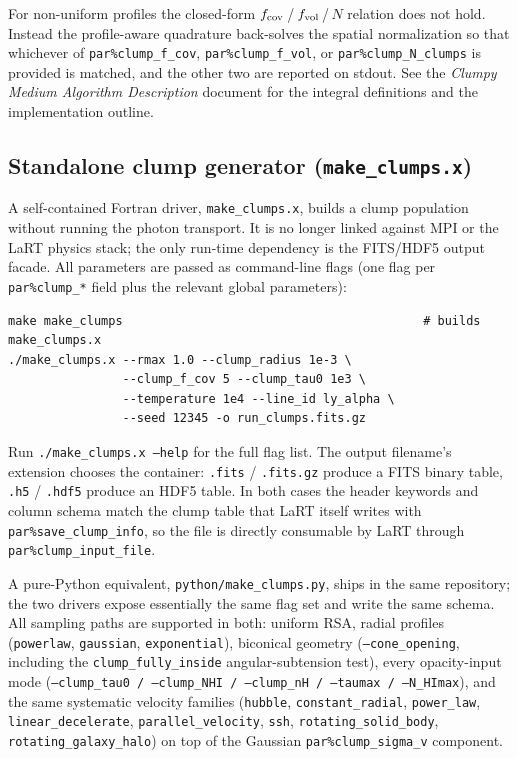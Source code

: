 \documentclass[english,a4paper]{my_memo}
\newcommand{\parm}[1]{\texttt{par\%#1}}
\begin{document}
\begin{sloppypar}
For non-uniform profiles the closed-form
$f_{\rm cov}$\,/\,$f_{\rm vol}$\,/\,$N$ relation does not hold.  Instead
the profile-aware quadrature back-solves the spatial normalization so
that whichever of \parm{clump\_f\_cov}, \parm{clump\_f\_vol}, or
\parm{clump\_N\_clumps} is provided is matched, and the other two are
reported on stdout.  See the \emph{Clumpy Medium Algorithm Description}
document for the integral definitions and the implementation outline.
\end{sloppypar}

\subsection{Standalone clump generator (\texttt{make\_clumps.x})}
\label{sec:make_clumps}

A self-contained Fortran driver, \texttt{make\_clumps.x}, builds a
clump population without running the photon transport.  It is no longer
linked against MPI or the LaRT physics stack; the only run-time
dependency is the FITS/HDF5 output facade.  All parameters are passed
as command-line flags (one flag per \texttt{par\%clump\_*} field plus
the relevant global parameters):

\begin{lstlisting}
make make_clumps                                          # builds make_clumps.x
./make_clumps.x --rmax 1.0 --clump_radius 1e-3 \
                --clump_f_cov 5 --clump_tau0 1e3 \
                --temperature 1e4 --line_id ly_alpha \
                --seed 12345 -o run_clumps.fits.gz
\end{lstlisting}

Run \texttt{./make\_clumps.x --help} for the full flag list.  The
output filename's extension chooses the container: \texttt{.fits} /
\texttt{.fits.gz} produce a FITS binary table, \texttt{.h5} /
\texttt{.hdf5} produce an HDF5 table.  In both cases the header
keywords and column schema match the clump table that LaRT itself
writes with \parm{save\_clump\_info}, so the file is directly
consumable by LaRT through \parm{clump\_input\_file}.

A pure-Python equivalent, \texttt{python/make\_clumps.py}, ships in the
same repository; the two drivers expose essentially the same flag set
and write the same schema.  All sampling paths are supported in both:
uniform RSA, radial profiles (\texttt{powerlaw}, \texttt{gaussian},
\texttt{exponential}), biconical geometry
(\texttt{--cone\_opening}, including the \texttt{clump\_fully\_inside}
angular-subtension test), every opacity-input mode
(\texttt{--clump\_tau0 / --clump\_NHI / --clump\_nH / --taumax /
--N\_HImax}), and the same systematic velocity families
(\texttt{hubble}, \texttt{constant\_radial}, \texttt{power\_law},
\texttt{linear\_decelerate}, \texttt{parallel\_velocity}, \texttt{ssh},
\texttt{rotating\_solid\_body}, \texttt{rotating\_galaxy\_halo}) on top
of the Gaussian \parm{clump\_sigma\_v} component.
\end{document}
